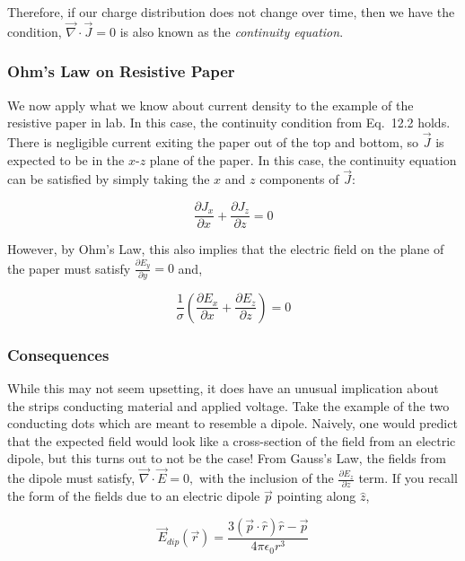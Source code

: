 \documentclass[12pt]{book}
\begin{document}
Therefore, if our charge distribution does not change over time, then we have the condition, $\vec{\nabla}\cdot \vec{J}=0$ is also known as the {\it continuity equation}.

\subsubsection{Ohm's Law on Resistive Paper}

We now apply what we know about current density to the example of the resistive paper in lab. In this case, the continuity condition from Eq.~12.2 holds. There is negligible current exiting the paper out of the top and bottom, so $\vec{J}$ is expected to be in the $x$-$z$ plane of the paper. In this case, the continuity equation can be satisfied by simply taking the $x$ and $z$ components of $\vec{J}$:

\begin{equation*}
 \frac{\partial J_x}{\partial x}+\frac{\partial J_z}{\partial z} = 0
\end{equation*}

However, by Ohm’s Law, this also implies that the electric field on the plane of the paper must satisfy
$\frac{\partial E_y}{\partial y} = 0$ and,

\begin{equation}
 \frac{1}{\sigma}\left(\frac{\partial E_x}{\partial x}+\frac{\partial E_z}{\partial z}\right) = 0
\end{equation}

\subsubsection{Consequences}

While this may not seem upsetting, it does have an unusual implication about the strips conducting material and applied voltage. Take the example of the two conducting dots which are meant to resemble a dipole. Naively, one would predict that the expected field would look like a cross-section of the field from an electric dipole, but this turns out to not be the case! From Gauss’s Law, the fields from the dipole must satisfy, $\vec{\nabla}\cdot \vec{E} = 0,$ with the inclusion of the $\frac{\partial E_z}{\partial z}$ term. If you recall the form of the fields due to an electric dipole $\vec{p}$ pointing along $\hat{z}$,

\begin{equation*}
 \vec{E}_{dip}(\vec{r}) = \frac{3(\vec{p}\cdot \hat{r})\hat{r}-\vec{p}}{4\pi \epsilon_0 r^3}
\end{equation*}
\end{document}

